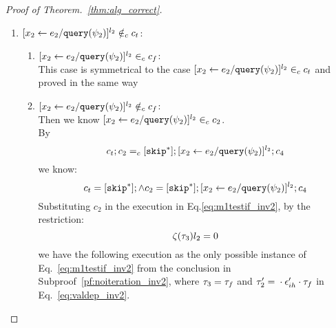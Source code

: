 \begin{proof}[Proof of Theorem.~\ref{thm:alg_correct}]
\begin{case}
\begin{subcase}
\begin{subsubcase}
\begin{subsubsubcase}
\begin{subproof}
\begin{enumerate}
 by uniqueness of label , 
 it must exist in the body of a while command in $c_2$,
 and $\eif ([b]^{l_b}, c_t, c_f) \in_c c_2$ and $[\assign{{x}_2}{\expr_2 / \query(\qexpr_2)}]^{l_2} \in_c c_t$. 
\\
%
i.e., $[\assign{{x}_2}{\expr_2 / \query(\qexpr_2)}]^{l_2}$ will only show up in $c_t$.
\\
%
By $\flowsto$ definition, we have:
\[
  \forall z_i^{r_i} \in \lvar_{c_t},  x_j^{l_j} \in \lvar_c \st x_j \in VAR(b) \land l_j = \llabel(\trace_{ih}) x_j \implies
  \flowsto(x_j^{l_j}, z_i^{r_i}, c)
\]
i.e.,
\[
  \bigwedge_{\{ x_j^{l_j} \in \lvar_c \vert x_j \in VAR(b) \land x_j^{l_j} \in \live^{l_b}(c)\}}
  \flowsto(x_j^{l_j}, x_2^{l_2}, c)
\]
%
Based on Eq.~\ref{eq:valdep_ihtestb}, we know:
%
\[
  \bigvee_{\{y_i^{r_i} \vert y_i \in VAR(b) \land r_i = \llabel(\trace_{ih}) y_i\}}
  \exists z_1^{j_1} \cdots z_m^{j_m}, m \in \mathbb{N} \st 
  \flowsto(x_1^{l_1}, z_1^{j_1}) \land \cdots \land  \flowsto(z_m^{j_m}, y_i^{r_i})
  \land \flowsto(y_i^{r_i}, x_2^{l_2}, c) 
\]
%
i.e.,
\[
\Big(\exists z_1^{r_1}, \cdots, z_n^{r_n} \in \lvar_{{c}} \st 0 \leq n 
 \land \flowsto(x_1^{l_1}, z_1^{r_1}, c) \land \cdots \land \flowsto(z_n^{r_n}, {x}_2^{l_2}, c) \Big)
\]
%
This case is proved.
\item $[\mathrel{ {x}_2 \leftarrow e_2 / {\tt query}(\psi_2) }]^{l_2} \notin_c c_t$:
\begin{enumerate}
 \item $[\mathrel{ {x}_2 \leftarrow e_2 / {\tt query}(\psi_2) }]^{l_2} \in_c c_f$:
 \\
 This case is symmetrical to the case $[\assign{{x}_2}{\expr_2 / \query(\qexpr_2)}]^{l_2} \in_c c_t$ and proved in the same way
 \item $[\mathrel{ {x}_2 \leftarrow e_2 / {\tt query}(\psi_2) }]^{l_2} \notin_c c_f$:
 \\
 Then we know $[\mathrel{ {x}_2 \leftarrow e_2 / {\tt query}(\psi_2) }]^{l_2} \in_c c_2$.
 \\
 By
 \[
  c_t;c_2 =_c [\mathtt{skip}^*]; [\mathrel{ {x}_2 \leftarrow e_2 / {\tt query}(\psi_2) }]^{l_2};{c}_4
\]
we know:
\[
  c_t = [\mathtt{skip}^*]; \land c_2 = [\mathtt{skip}^*]; [\mathrel{ {x}_2 \leftarrow e_2 / {\tt query}(\psi_2) }]^{l_2};{c}_4
\]
Substituting $c_2$ in the execution in Eq.\ref{eq:m1testif_inv2}, by the restriction:
\[
  \mathtt{\zeta}(\mathtt{\tau}_3)l_2 = 0
\]
we have the following execution as the only possible instance of Eq.~\ref{eq:m1testif_inv2} from the conclusion in Subproof~\ref{pf:noiteration_inv2}, where $\mathtt{\tau}_3 = \mathtt{\tau}_f$ 
and $\mathtt{\tau}_2' = {} \cdot {} \mathtt{\epsilon}_{ih}' \cdot \mathtt{\tau}_f$ in Eq.~\ref{eq:valdep_inv2}.

\end{enumerate}
\end{enumerate}
\end{subproof}
\end{subsubsubcase}
\end{subsubcase}
\end{subcase}
\end{case}
\end{proof}
